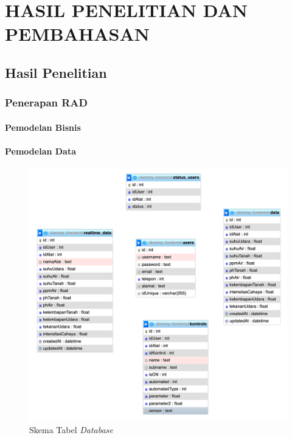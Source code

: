 \chapter{HASIL PENELITIAN DAN PEMBAHASAN}

%
\vspace{4.5pt}
\begin{flushleft}
    \begin{justify}
        \section{Hasil Penelitian}
        \subsection{Penerapan RAD}
        \subsubsection{Pemodelan Bisnis}
        \subsubsection{Pemodelan Data}
        \begin{figure}[ht]
            \centering
            \includegraphics[width=12cm]{images/database.png}
            \caption{Skema Tabel \textit{Database}}
        \end{figure}

\end{justify}
\end{flushleft}
